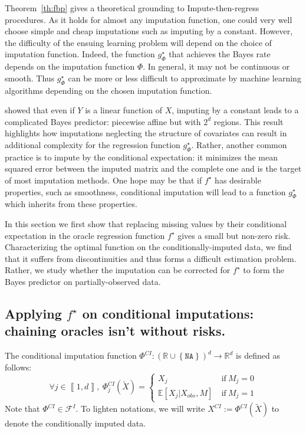 \documentclass{article}
\newcommand{\RR}{\mathbb{R}}
\newcommand{\E}{\mathbb{E}}
\newcommand{\Fcal}{\mathcal{F}}
\newcommand{\NA}{\mathtt{NA}}
\newcommand{\br}[1]{\left(#1\right)}
\newcommand{\sqb}[1]{\left[#1\right]}
\newcommand{\cbr}[1]{\left\{#1\right\}}
\newcommand{\bbr}[1]{\left\llbracket#1\right\rrbracket}
\theoremstyle{plain}
\begin{document}
Theorem~\ref{th:fbp} gives a theoretical grounding to Impute-then-regress procedures. As it holds for almost any imputation function, one could very well choose simple and cheap imputations such as imputing by a constant. However, the difficulty of the ensuing learning problem will depend on the choice of imputation function. Indeed, the function $g^\star_{\Phi}$ that achieves the Bayes rate depends on the imputation function $\Phi$. In general, it may not be continuous or smooth. Thus $g^\star_{\Phi}$ can be more or less difficult to approximate by machine learning algorithms depending on the chosen imputation function.

\citet{LeMorvan2020Linear} showed that even if $Y$ is a linear function of $X$, imputing by a constant leads to a complicated Bayes predictor: piecewise affine but with $2^d$ regions. This result highlights how imputations neglecting the structure of covariates can result in additional complexity for the regression function $g^\star_{\Phi}$. Rather, another common practice is to impute by the conditional expectation: it minimizes the mean squared error between the imputed matrix and the complete one and is the target of most imputation methods. One hope may be that if $f^\star$ has desirable properties, such as smoothness, conditional imputation will lead to a function $g^\star_{\Phi}$ which inherits from these properties.

In this section we first show that replacing missing values by their conditional expectation in the oracle regression function $f^\star$ gives a small but non-zero risk. Characterizing the optimal function on the conditionally-imputed data, we find that it suffers from discontinuities and thus forms a difficult estimation problem. Rather, we study whether the imputation can be corrected for $f^\star$ to form the Bayes predictor on partially-observed data.

\subsection{Applying $f^\star$ on conditional imputations: chaining oracles isn't without risks.}

The conditional imputation function $\Phi^{CI}: \br{\RR \cup \cbr{\NA}}^d \to \RR^d$ is defined as follows:
\begin{equation*}
     \forall j \in \bbr{1, d},\: \Phi^{CI}_j(\widetilde X) =
    \begin{cases}
        X_j \: &\text{if} \: M_j = 0\\
        \E \sqb{X_j | X_{obs}, M} \: &\text{if} \: M_j = 1
    \end{cases}
\end{equation*}
Note that $\Phi^{CI} \in \Fcal^I$. To lighten notations, we will write $X^{CI}:= \Phi^{CI}(\widetilde X)$ to denote the conditionally imputed data.
\end{document}
